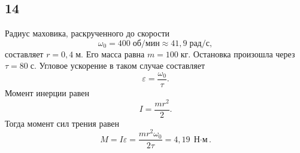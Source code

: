 \subsection{14}

Радиус маховика, раскрученного до скорости
\[
\omega_0=400\;\text{об/мин}\approx41{,}9\;\text{рад/с},
\]
составляет $r=0{,}4\;\text{м}$. Его масса равна $m=100\;\text{кг}$. Остановка произошла через $\tau=80\;\text{с}$. Угловое ускорение в таком случае составляет
\[
\varepsilon=\frac{\omega_0}{\tau}.
\]
Момент инерции равен
\[
I=\frac{mr^2}{2}.
\]
Тогда момент сил трения равен
\[
M=I\varepsilon=\frac{mr^2\omega_0}{2\tau}=4{,}19\;\text{Н$\cdot$м}.
\]
